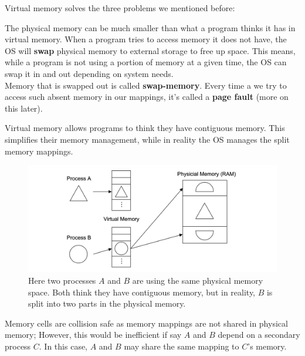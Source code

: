 \noindent
Virtual memory solves the three problems we mentioned before:
\begin{Def}

    The physical memory can be much smaller than what a program thinks it has in virtual memory. When a program tries to access memory 
    it does not have, the OS will \textbf{swap} physical memory to external storage to free up space. This means, while a program is not using 
    a portion of memory at a given time, the OS can swap it in and out depending on system needs.\\

    \noindent
    Memory that is swapped out is called \textbf{swap-memory}. Every time a we try to access such absent memory 
    in our mappings, it's called a \textbf{page fault} (more on this later).
\end{Def}

\newpage
\begin{Def}

    Virtual memory allows programs to think they have contiguous memory. This simplifies their 
    memory management, while in reality the OS manages the split memory mappings.
\end{Def}

\begin{figure}[h]
    \centering
    \includegraphics[width=\textwidth]{Sections/virt/frag.png}
    
    \vspace{1em}
    \caption{Here two processes $A$ and $B$ are using the same physical memory space. Both think they have 
    contiguous memory, but in reality, $B$ is split into two parts in the physical memory.}
    
    \label{fig:virt3}
\end{figure}

\begin{Def}

    Memory cells are collision safe as memory mappings are not shared in physical memory; However, this would be 
    inefficient if say $A$ and $B$ depend on a secondary process $C$. In this case, $A$ and $B$ may share the same mapping to $C$'s memory.
\end{Def}


